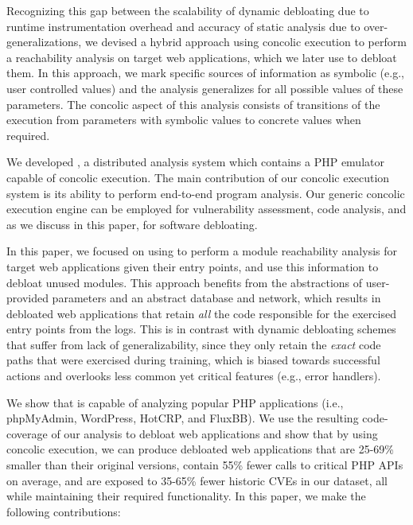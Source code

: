 Recognizing this gap between the scalability of dynamic debloating due to runtime instrumentation overhead and accuracy of static analysis due to over-generalizations, we devised a hybrid approach using concolic execution to perform a reachability analysis on target web applications, which we later use to debloat them. 
In this approach, we mark specific sources of information as symbolic (e.g., user controlled values) and the analysis generalizes for all possible values of these parameters. 
The concolic aspect of this analysis consists of transitions of the execution from parameters with symbolic values to concrete values when required. 

We developed \animatedead{}, a distributed analysis system which contains a PHP emulator capable of concolic execution. 
The main contribution of our concolic execution system is its ability to perform end-to-end program analysis. 
Our generic concolic execution engine can be employed for vulnerability assessment, code analysis, and as we discuss in this paper, for software debloating. 

In this paper, we focused on using \animatedead{} to perform a module reachability analysis for target web applications given their entry points, and use this information to debloat unused modules. 
This approach benefits from the abstractions of user-provided parameters and an abstract database and network, which results in debloated web applications that retain \emph{all} the code responsible for the exercised entry points from the logs. 
This is in contrast with dynamic debloating schemes that suffer from lack of generalizability, since they only retain the \emph{exact} code paths that were exercised during training, which is biased towards successful actions and overlooks less common yet critical features (e.g., error handlers). 

We show that \animatedead{} is capable of analyzing popular PHP applications (i.e., phpMyAdmin, WordPress, HotCRP, and FluxBB). 
We use the resulting code-coverage of our analysis to debloat web applications and show that by using concolic execution, we can produce debloated web applications that are 25-69\% smaller than their original versions, contain 55\% fewer calls to critical PHP APIs on average, and are exposed to 35-65\% fewer historic CVEs in our dataset, all while maintaining their required functionality. 
In this paper, we make the following contributions:

